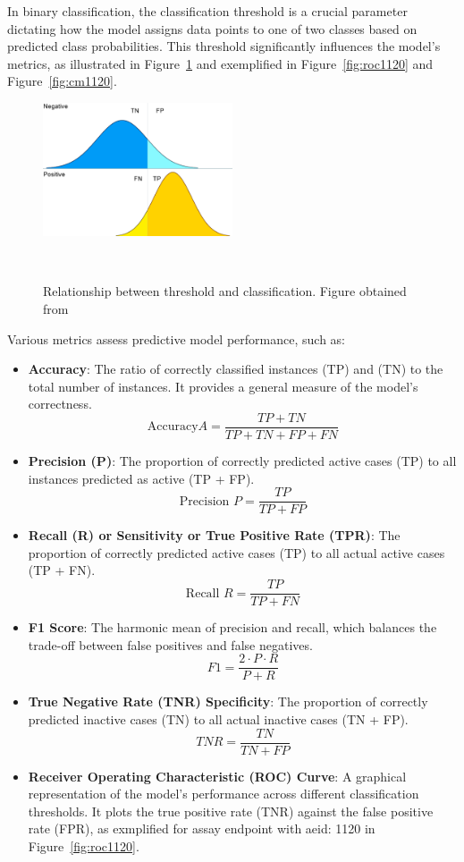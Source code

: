 In binary classification, the classification threshold is a crucial parameter dictating how the model assigns data points to one of two classes based on predicted class probabilities. This threshold significantly influences the model's metrics, as illustrated in Figure~\ref{fig:classification_threshold} and exemplified in Figure~\ref{fig:roc1120} and Figure~\ref{fig:cm1120}.
\begin{figure} 
  \centering
  \includegraphics[width=0.5\textwidth]{figures/classification_threshold.png}
  \caption{Relationship between threshold and classification. Figure obtained from~\cite{wicklin2020}}
~\label{fig:classification_threshold}
\end{figure}

Various metrics assess predictive model performance, such as:

\begin{itemize}
  \item \textbf{Accuracy}: The ratio of correctly classified instances (TP) and (TN) to the total number of instances. It provides a general measure of the model's correctness.
  \[ \text{Accuracy}  A = \frac{TP + TN}{TP + TN + FP + FN} \]

  \item \textbf{Precision (P)}: The proportion of correctly predicted active cases (TP) to all instances predicted as active (TP + FP). 
  \[ \text{Precision } P = \frac{TP}{TP + FP} \]

  \item \textbf{Recall (R) or Sensitivity or True Positive Rate (TPR)}: The proportion of correctly predicted active cases (TP) to all actual active cases (TP + FN).
  \[ \text{Recall } R = \frac{TP}{TP + FN} \]

  \item \textbf{F1 Score}: The harmonic mean of precision and recall, which balances the trade-off between false positives and false negatives.
  \[ F1 = \frac{2 \cdot P \cdot R}{P + R} \]

  \item \textbf{True Negative Rate (TNR) Specificity}: The proportion of correctly predicted inactive cases (TN) to all actual inactive cases (TN + FP).
  \[ TNR = \frac{TN}{TN + FP} \]

  \item \textbf{Receiver Operating Characteristic (ROC) Curve}: A graphical representation of the model's performance across different classification thresholds. It plots the true positive rate (TNR) against the false positive rate (FPR), as exmplified for assay endpoint with aeid: 1120 in Figure~\ref{fig:roc1120}.
\end{itemize}

